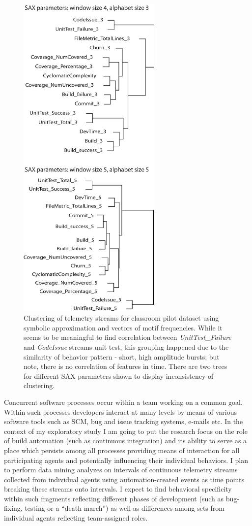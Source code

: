 \documentclass{sig-alternate}
\begin{document}
\begin{figure}[ht]
   \centering
   \includegraphics[height=165mm]{streams_clustering.eps}
   \caption{Clustering of telemetry streams for classroom pilot dataset using symbolic approximation and vectors of motif frequencies. While it seems to be meaningful to find correlation between \textit{UnitTest\_Failure} and \textit{CodeIssue} streams unit test, this grouping happened due to the similarity of behavior pattern - short, high amplitude bursts; but note, there is no correlation of features in time. There are two trees for different SAX parameters shown to display inconsistency of clustering.}
   \label{fig:cluster_streams}
\end{figure}

Concurrent software processes occur within a team working on a common goal. Within such processes developers interact at many levels by means of various software tools such as SCM, bug and issue tracking systems, e-mails etc. In the context of my exploratory study I am going to put the research focus on the role of build automation (such as continuous integration) and its ability to serve as a place which persists among all processes providing means of interaction for all participating agents and potentially influencing their individual behaviors. I plan to perform data mining analyzes on intervals of continuous telemetry streams collected from individual agents using automation-created events as time points breaking these streams onto intervals. I expect to find behavioral specificity within such fragments reflecting different phases of development (such as bug-fixing, testing or a ``death march'') as well as differences among sets from individual agents reflecting team-assigned roles.
\end{document}
